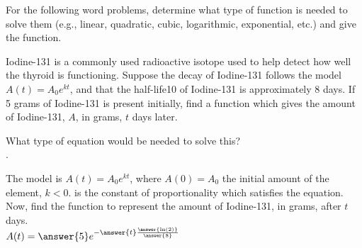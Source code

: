 \documentclass{ximera}
\author{Elizabeth Campolongo}
\begin{document}
\begin{exercise}
For the following word problems, determine what type of function is needed to solve them (e.g., linear, quadratic, cubic, logarithmic, exponential, etc.) and give the function. 
%

\item  Iodine-131 is a commonly used radioactive isotope used to help detect how well
the thyroid is functioning. Suppose the decay of Iodine-131 follows the model $A(t) = A_0e^{kt}$,
and that the half-life10 of Iodine-131 is approximately 8 days. 
If 5 grams of Iodine-131 is present
initially, find a function which gives the amount of Iodine-131, $A$, in grams, $t$ days later.

What type of equation would be needed to solve this?\\
.
\begin{exercise}
The model is $A(t) = A_0e^{kt}$, where $A(0)=A_0$ the initial amount of the element, $k<0$. is the constant of proportionality which satisfies the equation. \\
Now, find the function to represent the amount of Iodine-131, in grams, after $t$ days. \\
$A(t) = \answer{5}e^{-\answer{t} \frac{\answer{\ln(2)}}{\answer{8}}}$
\end{exercise}


\end{exercise}
\end{document}
